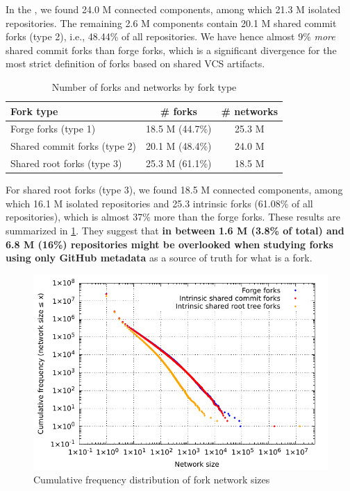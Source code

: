 In the \SWHGD{}, we found 24.0 M connected components, among which 21.3 M
isolated repositories. The remaining 2.6 M components contain 20.1 M shared
commit forks (type 2), i.e., 48.44\% of all repositories. We have hence almost
9\% \emph{more} shared commit forks than forge forks, which is a significant
divergence for the most strict definition of forks based on shared VCS
artifacts.

\begin{table}[t]
    \centering
    \caption{Number of forks and networks by fork type}%
    \label{tab:fork-network-results}
    \begin{tabular}{l|c|c}
      \textbf{Fork type} & \textbf{\# forks} & \textbf{\# networks} \\
      \hline
      Forge forks (type 1)         & 18.5 M (44.7\%) & 25.3 M \\
      Shared commit forks (type 2) & 20.1 M (48.4\%) & 24.0 M \\
      Shared root forks (type 3)   & 25.3 M (61.1\%) & 18.5 M \\
    \end{tabular}
\end{table}

For shared root forks (type 3), we found 18.5 M connected components, among
which 16.1 M isolated repositories and 25.3 intrinsic forks (61.08\% of all
repositories), which is almost 37\% more than the forge forks. These results
are summarized in \cref{tab:fork-network-results}.  They suggest that
\textbf{in between 1.6 M (3.8\% of total) and 6.8 M (16\%) repositories might
  be overlooked when studying forks using only GitHub metadata} as a source of
truth for what is a fork.

\begin{figure}[t]
    \centering
    \includegraphics[width=0.8\linewidth]{img/forks/fork-network-freq-distribution.pdf}
    \caption{Cumulative frequency distribution of fork network sizes}%
    \label{fig:fork-network-freq-distrib}
\end{figure}

